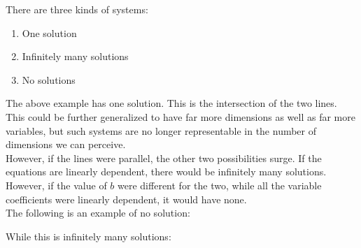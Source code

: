 \documentclass[nobib]{tufte-handout}
\begin{document}
There are three kinds of systems:
\begin{enumerate}
    \item One solution
    \item Infinitely many solutions
    \item No solutions
\end{enumerate}
The above example has one solution. This is the intersection of the two lines. This could be further generalized to have far more dimensions as well as far more variables, but such systems are no longer representable in the number of dimensions we can perceive.\\
However, if the lines were parallel, the other two possibilities surge. If the equations are linearly dependent, there would be infinitely many solutions. However, if the value of $b$ were different for the two, while all the variable coefficients were linearly dependent, it would have none.\\
The following is an example of no solution:
\begin{center}
\end{center}
While this is infinitely many solutions:
\begin{center}
\end{center}
\end{document}
